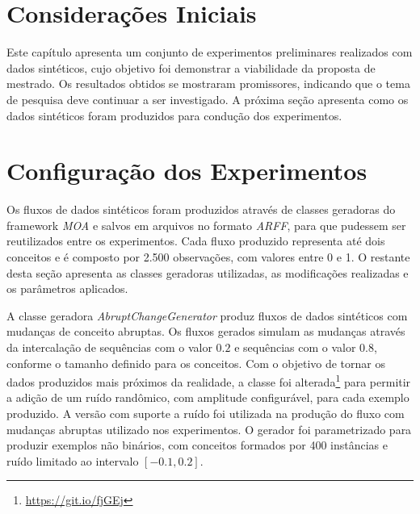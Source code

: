 \documentclass[qual, classic, a4paper]{ufbathesis}
\begin{document}
 \label{experimentos_iniciais}
\section{Considerações Iniciais}

Este capítulo apresenta um conjunto de experimentos preliminares realizados com dados sintéticos, cujo objetivo foi demonstrar a viabilidade da proposta de mestrado.
%
Os resultados obtidos se mostraram promissores, indicando que o tema de pesquisa deve continuar a ser investigado.
%
A próxima seção apresenta como os dados sintéticos foram produzidos para condução dos experimentos.

\section{Configuração dos Experimentos}
\label{sec:configuracao_experimentos}

Os fluxos de dados sintéticos foram produzidos através de classes geradoras do framework \textit{MOA} e salvos em arquivos no formato \textit{ARFF}, para que pudessem ser reutilizados entre os experimentos.
Cada fluxo produzido representa até dois conceitos e é composto por 2.500 observações, com valores entre 0 e 1.
O restante desta seção apresenta as classes geradoras utilizadas, as modificações realizadas e os parâmetros aplicados.

A classe geradora \textit{AbruptChangeGenerator} produz fluxos de dados sintéticos com mudanças de conceito abruptas.
Os fluxos gerados simulam as mudanças através da intercalação de sequências com o valor $0.2$ e sequências com o valor $0.8$, conforme o tamanho definido para os conceitos.
Com o objetivo de tornar os dados produzidos mais próximos da realidade, a classe foi alterada\footnote{\url{https://git.io/fjGEj}} para permitir a adição de um ruído randômico, com amplitude configurável, para cada exemplo produzido.
A versão com suporte a ruído foi utilizada na produção do fluxo com mudanças abruptas utilizado nos experimentos.
O gerador foi parametrizado para produzir exemplos não binários, com conceitos formados por 400 instâncias e ruído limitado ao intervalo $[-0.1, 0.2]$.


\end{document}
